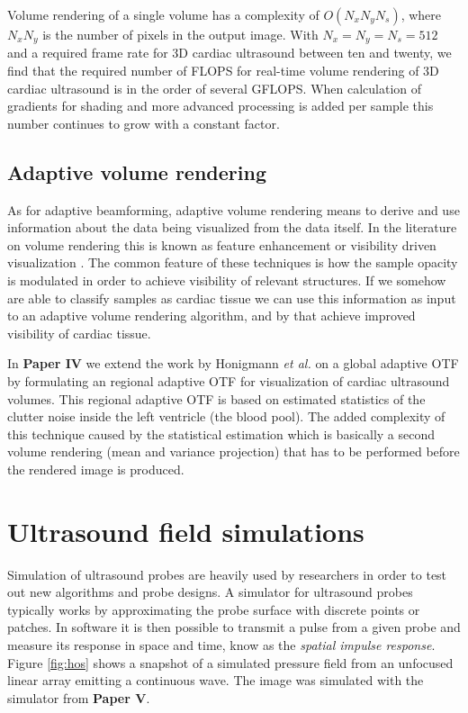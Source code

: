 Volume rendering of a single volume has a complexity of $O(N_xN_yN_s)$, where $N_xN_y$ is the number of pixels in the output image. With $N_x = N_y = N_s = 512$ and a required frame rate for 3D cardiac ultrasound between ten and twenty, we find that the required number of FLOPS for real-time volume rendering of 3D cardiac ultrasound is in the order of several GFLOPS. When calculation of gradients for shading and more advanced processing is added per sample this number continues to grow with a constant factor.

\subsection{Adaptive volume rendering}
As for adaptive beamforming, adaptive volume rendering means to derive and use information about the data being visualized from the data itself. In the literature on volume rendering this is known as feature enhancement or visibility driven visualization \cite{viola2005, correa2010visibility, marchesin2010}. The common feature of these techniques is how the sample opacity is modulated in order to achieve visibility of relevant structures. If we somehow are able to classify samples as cardiac tissue we can use this information as input to an adaptive volume rendering algorithm, and by that achieve improved visibility of cardiac tissue.

In \textbf{Paper IV} we extend the work by Honigmann \textit{et al.} \cite{Honigmann2003} on a global adaptive OTF by formulating an regional adaptive OTF for visualization of cardiac ultrasound volumes. This regional adaptive OTF is based on estimated statistics of the clutter noise inside the left ventricle (the blood pool). The added complexity of this technique caused by the statistical estimation which is basically a second volume rendering (mean and variance projection) that has to be performed before the rendered image is produced.

\section{Ultrasound field simulations}\label{sec:field}
Simulation of ultrasound probes are heavily used by researchers in order to test out new algorithms and probe designs. A simulator for ultrasound probes typically works by approximating the probe surface with discrete points or patches. In software it is then possible to transmit a pulse from a given probe and measure its response in space and time, know as the \textit{spatial impulse response}. Figure \ref{fig:hos} shows a snapshot of a simulated pressure field from an unfocused linear array emitting a continuous wave. The image was simulated with the simulator from \textbf{Paper V}. 

